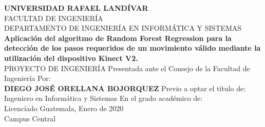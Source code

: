 \begin{center}
{\LARGE \textbf{UNIVERSIDAD RAFAEL LAND\'IVAR}}\\[0.1cm]
{\normalsize FACULTAD DE INGENIER\'IA}\\[0.1cm]
{\normalsize DEPARTAMENTO DE INGENIER\'IA EN INFORM\'ATICA Y SISTEMAS}\\[4cm]
{\huge \textbf{Aplicaci\'on del algoritmo de Random Forest Regression para la detecci\'on de los pasos requeridos de un movimiento v\'alido mediante la utilizaci\'on del dispositivo Kinect V2.}}\\[0.1cm]
{\LARGE PROYECTO DE INGENIER\'IA}
\vfill
{\LARGE Presentada ante el Consejo de la Facultad de Ingenier\'ia}
\vfill
{\LARGE Por:}\\[0.1cm]
{\LARGE \textbf{DIEGO JOS\'E ORELLANA BOJORQUEZ}}
\vfill
Previo a optar el t\'itulo de:\\[0.1cm]
Ingeniero en Inform\'atica y Sistemas
\vfill
En el grado acad\'emico de:\\[0.1cm]
Licenciado
\vfill
Guatemala, Enero de 2020\\[0.1cm]
Campus Central
\end{center}